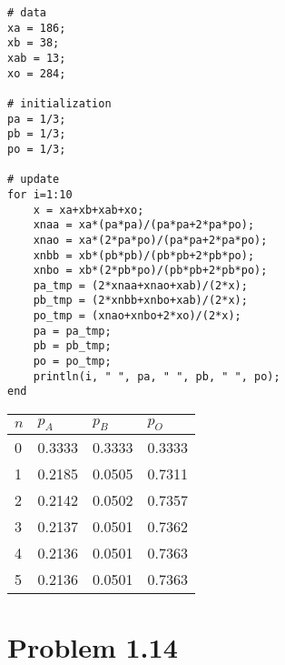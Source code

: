 \documentclass{scrartcl}
\begin{document}
\begin{verbatim}
# data
xa = 186;
xb = 38;
xab = 13;
xo = 284;

# initialization
pa = 1/3;
pb = 1/3;
po = 1/3;

# update
for i=1:10
    x = xa+xb+xab+xo;
    xnaa = xa*(pa*pa)/(pa*pa+2*pa*po);
    xnao = xa*(2*pa*po)/(pa*pa+2*pa*po);
    xnbb = xb*(pb*pb)/(pb*pb+2*pb*po);
    xnbo = xb*(2*pb*po)/(pb*pb+2*pb*po);
    pa_tmp = (2*xnaa+xnao+xab)/(2*x);
    pb_tmp = (2*xnbb+xnbo+xab)/(2*x);
    po_tmp = (xnao+xnbo+2*xo)/(2*x);
    pa = pa_tmp;
    pb = pb_tmp;
    po = po_tmp;
    println(i, " ", pa, " ", pb, " ", po);
end
\end{verbatim}

\begin{table}[htb]
	\centering
	\begin{tabular}{| l | l | l | l |}
		\hline
		$n$ & $p_A$ & $p_B$ & $p_O$ \\ \hline
		0 & 0.3333 & 0.3333 & 0.3333 \\ \hline
		1 & 0.2185 & 0.0505 & 0.7311 \\ \hline
		2 & 0.2142 & 0.0502 & 0.7357 \\ \hline
		3 & 0.2137 & 0.0501 & 0.7362 \\ \hline
		4 & 0.2136 & 0.0501 & 0.7363 \\ \hline
		5 & 0.2136 & 0.0501 & 0.7363 \\ \hline
	\end{tabular}
\end{table}

\section*{Problem 1.14}
\end{document}
